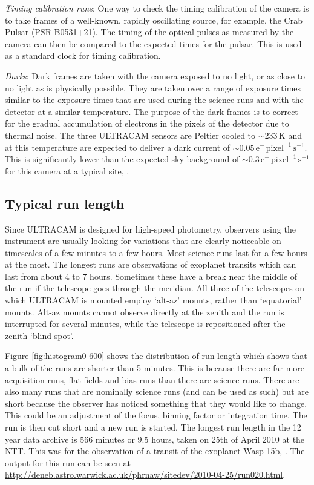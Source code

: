 \emph{Timing calibration runs}: One way to check the timing calibration of the camera is to take frames of a well-known, rapidly oscillating source, for example, the Crab Pulsar (PSR B0531+21). The timing of the optical pulses as measured by the camera can then be compared to the expected times for the pulsar. This is used as a standard clock for timing calibration.

\emph{Darks}: Dark frames are taken with the camera exposed to no light, or as close to no light as is physically possible. They are taken over a range of exposure times similar to the exposure times that are used during the science runs and with the detector at a similar temperature. The purpose of the dark frames is to correct for the gradual accumulation of electrons in the pixels of the detector due to thermal noise. The three ULTRACAM sensors are Peltier cooled to $\sim 233\,\mbox{K}$ and at this temperature are expected to deliver a dark current of $\sim0.05\,\mbox{e}^{-}\,\mbox{pixel}^{-1}\,\mbox{s}^{-1}$. This is significantly lower than the expected sky background of $\sim0.3\,\mbox{e}^{-}\,\mbox{pixel}^{-1}\,\mbox{s}^{-1}$ for this camera at a typical site, \citet{dhillon07}. 

\subsection{Typical run length}
Since ULTRACAM is designed for high-speed photometry, observers using the instrument are usually looking for variations that are clearly noticeable on timescales of a few minutes to a few hours. Most science runs last for a few hours at the most. The longest runs are observations of exoplanet transits which can last from about 4 to 7 hours. Sometimes these have a break near the middle of the run if the telescope goes through the meridian. All three of the telescopes on which ULTRACAM is mounted employ `alt-az' mounts, rather than `equatorial' mounts. Alt-az mounts cannot observe directly at the zenith and the run is interrupted for several minutes, while the telescope is repositioned after the zenith `blind-spot'.

Figure \ref{fig:histogram0-600} shows the distribution of run length which shows that a bulk of the runs are shorter than 5 minutes. This is because there are far more acquisition runs, flat-fields and bias runs than there are science runs. There are also many runs that are nominally science runs (and can be used as such) but are short because the observer has noticed something that they would like to change. This could be an adjustment of the focus, binning factor or integration time. The run is then cut short and a new run is started. The longest run length in the 12 year data archive is 566 minutes or 9.5 hours, taken on 25th of April 2010 at the NTT. This was for the observation of a transit of the exoplanet Wasp-15b, \citep{Wasp15b}. The output for this run can be seen at \url{http://deneb.astro.warwick.ac.uk/phrnaw/sitedev/2010-04-25/run020.html}. 

